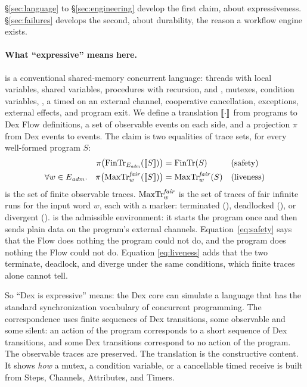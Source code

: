 \S\ref{sec:language} to \S\ref{sec:engineering} develop the first
claim, about expressiveness. \S\ref{sec:failures} develops the second,
about durability, the reason a workflow engine exists.

\paragraph{What ``expressive'' means here.}
\Lang{} is a conventional shared-memory concurrent language: threads with
local variables, shared variables, procedures with recursion,  and
, mutexes, condition variables, , a timed  on
an external channel, cooperative cancellation, exceptions, external effects,
and program exit. We define a translation $\llbracket \cdot \rrbracket$ from \Lang{} programs
to Dex Flow definitions, a set of observable events on each side, and a
projection $\pi$ from Dex events to \Lang{} events. The claim is two
equalities of trace sets, for every well-formed \Lang{} program $S$:
\begin{align}
\pi\bigl(\mathrm{FinTr}_{E_{\mathit{adm}}}(\llbracket S \rrbracket)\bigr) &= \mathrm{FinTr}(S)
  && \text{(safety)} \label{eq:safety}\\
\forall w \in E_{\mathit{adm}}.\quad
\pi\bigl(\mathrm{MaxTr}^{\mathit{fair}}_{w}(\llbracket S \rrbracket)\bigr) &= \mathrm{MaxTr}^{\mathit{fair}}_{w}(S)
  && \text{(liveness)} \label{eq:liveness}
\end{align}
\FinTr{} is the set of finite observable traces. $\mathrm{MaxTr}^{\mathit{fair}}_w$
is the set of traces of fair infinite runs for the input word $w$, each
with a marker: terminated (\mterm), deadlocked (\mdead), or divergent
(\mdiv). \Eadm{} is the admissible environment: it starts the program once
and then sends plain data on the program's external channels.
Equation~\eqref{eq:safety} says that the Flow does nothing the program could
not do, and the program does nothing the Flow could not do. Equation
\eqref{eq:liveness} adds that the two terminate, deadlock, and diverge under
the same conditions, which finite traces alone cannot tell.

So ``Dex is expressive'' means: the Dex core can simulate a language that
has the standard synchronization vocabulary of concurrent programming. The
correspondence uses finite sequences of Dex transitions, some observable
and some silent: an action of the program corresponds to a short sequence
of Dex transitions, and some Dex transitions correspond to no action of
the program. The observable traces are preserved. The translation is
the constructive content. It shows \emph{how} a mutex, a condition variable,
or a cancellable timed receive is built from Steps, Channels, Attributes,
and Timers.

